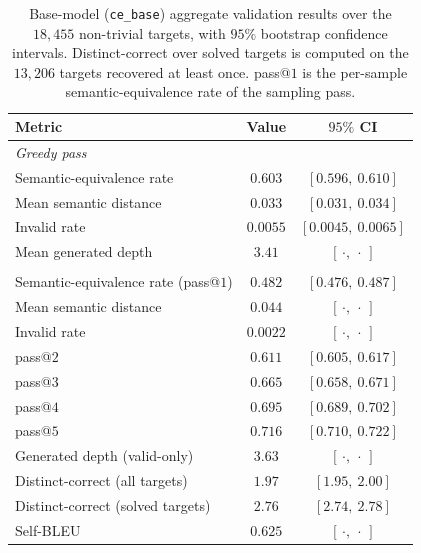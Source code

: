 \documentclass[titlepage,a4paper,11pt]{report}
\begin{document}
    \begin{table}[ht]
        \centering
        \caption{Base-model (\texttt{ce\_base}) aggregate validation results over the $18{,}455$ non-trivial targets, with $95\%$ bootstrap confidence intervals. Distinct-correct over solved targets is computed on the $13{,}206$ targets recovered at least once. \textup{pass}@$1$ is the per-sample semantic-equivalence rate of the sampling pass.}
        \label{tab:exp1_results_overall}
        \begin{tabular}{lcc}
            \toprule
            Metric & Value & $95\%$ CI \\
            \midrule
            \multicolumn{3}{l}{\emph{Greedy pass}} \\
            \quad Semantic-equivalence rate & $0.603$ & $[0.596,\ 0.610]$ \\
            \quad Mean semantic distance    & $0.033$ & $[0.031,\ 0.034]$ \\
            \quad Invalid rate              & $0.0055$ & $[0.0045,\ 0.0065]$ \\
            \quad Mean generated depth      & $3.41$ & $[\,\cdot,\ \cdot\,]$ \\
            \addlinespace
            \multicolumn{3}{l}{\emph{Sampling pass}} \\
            \quad Semantic-equivalence rate (pass@$1$) & $0.482$ & $[0.476,\ 0.487]$ \\
            \quad Mean semantic distance    & $0.044$ & $[\,\cdot,\ \cdot\,]$ \\
            \quad Invalid rate              & $0.0022$ & $[\,\cdot,\ \cdot\,]$ \\
            \quad pass@$2$                  & $0.611$ & $[0.605,\ 0.617]$ \\
            \quad pass@$3$                  & $0.665$ & $[0.658,\ 0.671]$ \\
            \quad pass@$4$                  & $0.695$ & $[0.689,\ 0.702]$ \\
            \quad pass@$5$                  & $0.716$ & $[0.710,\ 0.722]$ \\
            \quad Generated depth (valid-only) & $3.63$ & $[\,\cdot,\ \cdot\,]$ \\
            \quad Distinct-correct (all targets)    & $1.97$ & $[1.95,\ 2.00]$ \\
            \quad Distinct-correct (solved targets) & $2.76$ & $[2.74,\ 2.78]$ \\
            \quad Self-BLEU                 & $0.625$ & $[\,\cdot,\ \cdot\,]$ \\
            \bottomrule
        \end{tabular}
    \end{table}
\end{document}
